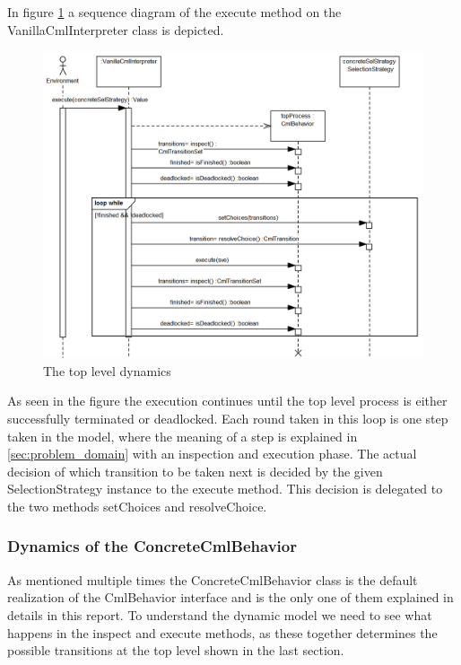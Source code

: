 \documentclass[a4paper, 10pt]{include/compassreport}   %
\begin{document}
In figure \ref{fig:dynamic_toplevel} a sequence diagram of the execute
method on the VanillaCmlInterpreter class is depicted.

\begin{figure}[ht!]
  \begin{center}
    \includegraphics[width=1\textwidth]{figures/DynamicTopLevel}
    \caption{The top level dynamics}
    \label{fig:dynamic_toplevel}
  \end{center}
\end{figure}

As seen in the figure the execution continues until the top level
process is either successfully terminated or deadlocked. Each round
taken in this loop is one step taken in the model, where the meaning
of a step is explained in \autoref{sec:problem_domain} with an
inspection and execution phase. The actual decision of which
transition to be taken next is decided by the given SelectionStrategy
instance to the execute method. This decision is delegated to the two
methods setChoices and resolveChoice.

\subsubsection*{Dynamics of the ConcreteCmlBehavior}

As mentioned multiple times the ConcreteCmlBehavior class is the
default realization of the CmlBehavior interface and is the only one
of them explained in details in this report. To understand the dynamic
model we need to see what happens in the inspect and execute methods,
as these together determines the possible transitions at the top level
shown in the last section.
\end{document}
